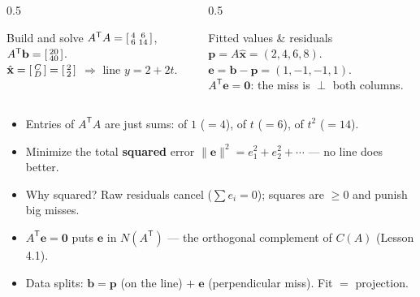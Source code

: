 \documentclass[aspectratio=169, 11pt]{beamer}
\newcommand{\xx}{\mathbf{x}}
\newcommand{\bb}{\mathbf{b}}
\newcommand{\pp}{\mathbf{p}}
\newcommand{\ee}{\mathbf{e}}
\newcommand{\zero}{\mathbf{0}}
\newcommand{\T}{\mathsf{T}}
\begin{document}
\begin{frame}[t, plain]
  \sectionlabel[goldacc]{$t=0,1,2,3$, \; $\bb=(3,3,5,9)$}
  \begin{columns}[T]
    \begin{column}{0.5\textwidth}
      \begin{block}{Build and solve}
        $A^{\T}A=\begin{bsmallmatrix} 4 & 6\\ 6 & 14 \end{bsmallmatrix}$,\;
        $A^{\T}\bb=\begin{bsmallmatrix} 20\\ 40 \end{bsmallmatrix}$.\\[3pt]
        $\hat{\xx}=\begin{bsmallmatrix} C\\ D \end{bsmallmatrix}=\begin{bsmallmatrix} 2\\ 2 \end{bsmallmatrix}$
        $\Rightarrow$ line $y=2+2t$.
      \end{block}
    \end{column}
    \begin{column}{0.5\textwidth}
      \begin{block}{Fitted values \& residuals}
        $\pp=A\hat{\xx}=(2,4,6,8)$.\\[3pt]
        $\ee=\bb-\pp=(1,-1,-1,1)$.\\[3pt]
        $A^{\T}\ee=\zero$: the miss is $\perp$ both columns.
      \end{block}
    \end{column}
  \end{columns}
  \vspace{4pt}
  \begin{itemize}
    \item Entries of $A^{\T}A$ are just sums: of $1$ ($=4$), of $t$ ($=6$), of $t^2$ ($=14$).
  \end{itemize}
\end{frame}

\begin{frame}[t, plain]
  \begin{itemize}
    \setlength{\itemsep}{6pt}
    \item Minimize the total \textbf{squared} error $\|\ee\|^2=e_1^2+e_2^2+\cdots$ --- no line does better.
    \item Why squared? Raw residuals cancel ($\sum e_i=0$); squares are $\ge 0$ and punish big misses.
    \item $A^{\T}\ee=\zero$ puts $\ee$ in $N(A^{\T})$ --- the orthogonal complement of $C(A)$ (Lesson 4.1).
    \item Data splits: $\bb=\pp$ (on the line) $+\;\ee$ (perpendicular miss). Fit $=$ projection.
  \end{itemize}
\end{frame}
\end{document}
